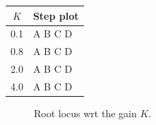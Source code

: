 \documentclass[letter,12pt]{scrartcl}
\begin{document}
\begin{center}
\begin{tabular}{cl}
\(K\) & Step plot\\\hline
0.1 & A\hspace*{2mm} B\hspace*{2mm} C\hspace*{2mm} D\\
0.8 & A\hspace*{2mm}  B\hspace*{2mm}  C\hspace*{2mm} D\\
2.0 & A\hspace*{2mm} B\hspace*{2mm}  C\hspace*{2mm} D\\
4.0 & A\hspace*{2mm} B\hspace*{2mm}  C\hspace*{2mm} D\\ \hline
\end{tabular}
\end{center}

\begin{figure}[h]
\begin{center}

\caption{Root locus wrt the gain $K$.}
\label{fig:rlocus}
\end{center}
\end{figure}
\end{document}
